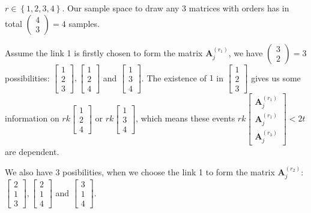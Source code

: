 \begin{example}
$r\in\left\{ 1,2,3,4\right\} $. Our sample space to draw any 3 matrices
with orders has in total $\left(\begin{array}{c}
4\\
3
\end{array}\right)=4$ samples.

Assume the link 1 is firstly chosen to form the matrix $\boldsymbol{A}_{j}^{\left(r_{1}\right)}$,
we have $\left(\begin{array}{c}
3\\
2
\end{array}\right)=3$ possibilities: $\left[\begin{array}{c}
1\\
2\\
3
\end{array}\right],\left[\begin{array}{c}
1\\
2\\
4
\end{array}\right]$ and $\left[\begin{array}{c}
1\\
3\\
4
\end{array}\right]$. The existence of $1$ in $\left[\begin{array}{c}
1\\
2\\
3
\end{array}\right]$ gives us some information on $rk\left[\begin{array}{c}
1\\
2\\
4
\end{array}\right]$ or $rk\left[\begin{array}{c}
1\\
3\\
4
\end{array}\right]$, which means these events $rk\left[\begin{array}{c}
\boldsymbol{A}_{j}^{\left(r_{1}\right)}\\
\boldsymbol{A}_{j}^{\left(r_{1}\right)}\\
\boldsymbol{A}_{j}^{\left(r_{3}\right)}
\end{array}\right]<2t$ are dependent. 

We also have 3 posibilities, when we choose the link 1 to form the
matrix $\boldsymbol{A}_{j}^{\left(r_{2}\right)}$: $\left[\begin{array}{c}
2\\
1\\
3
\end{array}\right],\left[\begin{array}{c}
2\\
1\\
4
\end{array}\right]$ and $\left[\begin{array}{c}
3\\
1\\
4
\end{array}\right]$. 


\end{example}
